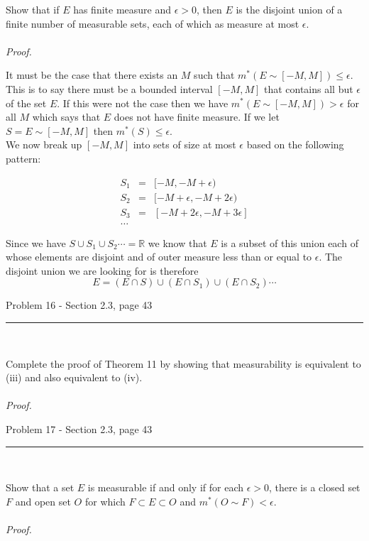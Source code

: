 \documentclass[11pt,reqno]{article}
\begin{document}
Show that if $E$ has finite measure and $\epsilon > 0$, then $E$ is the disjoint union of a finite number of measurable sets, each of which as measure at most $\epsilon$.
\\\\ \emph{Proof.}

It must be the case that there exists an $M$ such that $m^*(E \sim [-M, M]) \le \epsilon$.  This is to say there must be a bounded interval $[-M, M]$ that contains all but $\epsilon$ of the set $E$. If this were not the case then we have  $m^*(E \sim [-M, M]) > \epsilon$ for all $M$ which says that $E$ does not have finite measure. If we let $S = E \sim [-M, M]$ then $m^*(S) \le \epsilon$.\\
\indent We now break up $[-M, M]$ into sets of size at most $\epsilon$ based on the following pattern:

\begin{eqnarray*}
S_1 &=& [-M, -M + \epsilon)\\
S_2 &=& [-M + \epsilon, -M + 2 \epsilon)\\
S_3 &=& [-M + 2 \epsilon, -M + 3 \epsilon]\\
\ldots&&
\end{eqnarray*}

\indent Since we have $S \cup S_1 \cup S_2 \cdots = \mathbb{R}$ we know that $E$ is a subset of this union each of whose elements are disjoint and of outer measure less than or equal to $\epsilon$. The disjoint union we are looking for is therefore
\[ E = (E \cap S) \cup (E \cap S_1) \cup (E \cap S_2) \cdots \]


\begin{flushleft} 
Problem 16 - Section 2.3, page 43\\
\rule{500pt}{1pt}\\
\end{flushleft} 

Complete the proof of Theorem 11 by showing that measurability is equivalent to (iii) and also equivalent to (iv).
\\\\ \emph{Proof.}

\begin{flushleft} 
Problem 17 - Section 2.3, page 43\\
\rule{500pt}{1pt}\\
\end{flushleft} 

Show that a set $E$ is measurable if and only if for each $\epsilon > 0$,  there is a closed set $F$ and open set $O$ for which $F \subset E \subset O$  and $m^*(O \sim F) < \epsilon$.
\\\\ \emph{Proof.}
\end{document}
